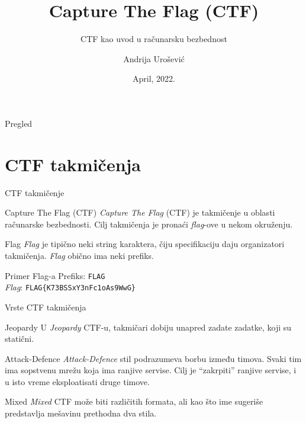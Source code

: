 \documentclass[aspectratio=169,xcolor=dvipsnames]{beamer}
\title[short title]{Capture The Flag (CTF)}
\subtitle{CTF kao uvod u računarsku bezbednost}
\author[andrija] {Andrija Urošević}
\institute[matf]
{
    Univerzitet u Beogradu \\
    Matematički fakultet
}
\date{April, 2022.}
\begin{document}
\begin{frame}
    \titlepage
\end{frame}

\begin{frame}{Pregled}
    \tableofcontents
\end{frame}

\section{CTF takmičenja}

\begin{frame}{CTF takmičenje}

    \begin{block}{Capture The Flag (CTF)}
        \emph{Capture The Flag} (CTF) je takmičenje u oblasti računarske 
        bezbednosti. Cilj takmičenja je pronaći \emph{flag}-ove u nekom 
        okruženju.
    \end{block}

    \begin{block}{Flag}
        \emph{Flag} je tipično neki string karaktera, čiju specifikaciju daju
        organizatori takmičenja. \emph{Flag} obično ima neki prefiks.
    \end{block}

    \begin{exampleblock}{Primer Flag-a}
        Prefiks: \texttt{FLAG} \\
        \emph{Flag}: \texttt{FLAG\{K73BSSxY3nFc1oAs9WwG\}}
    \end{exampleblock}


\end{frame}


\begin{frame}{Vrste CTF takmičenja}

    \begin{block}{Jeopardy}
        U \emph{Jeopardy} CTF-u, takmičari dobiju unapred zadate zadatke, 
        koji su statični.
    \end{block}

    \begin{block}{Attack-Defence}
        \emph{Attack-Defence} stil podrazumeva borbu između timova. Svaki 
        tim ima sopstvenu mrežu koja ima ranjive servise. Cilj je ``zakrpiti'' 
        ranjive servise, i u isto vreme eksploatisati druge timove. 
    \end{block}

    \begin{block}{Mixed}
        \emph{Mixed} CTF može biti različitih formata, ali kao što ime sugeriše 
        predstavlja mešavinu prethodna dva stila.
    \end{block}
    
\end{frame}
\end{document}
